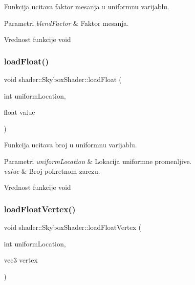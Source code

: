Funkcija ucitava faktor mesanja u uniformnu varijablu. 


\begin{DoxyParams}{Parametri}
{\em blend\+Factor} & Faktor mesanja. \\
\hline
\end{DoxyParams}
\begin{DoxyReturn}{Vrednost funkcije}
void 
\end{DoxyReturn}
\mbox{\label{classshader_1_1SkyboxShader_a76e48c257263e1434e465539824c6670}} 
\subsubsection{\texorpdfstring{load\+Float()}{loadFloat()}}
{\footnotesize\ttfamily void shader\+::\+Skybox\+Shader\+::load\+Float (\begin{DoxyParamCaption}\item[{int}]{uniform\+Location,  }\item[{float}]{value }\end{DoxyParamCaption})}



Funkcija ucitava broj u uniformnu varijablu. 


\begin{DoxyParams}{Parametri}
{\em uniform\+Location} & Lokacija uniformne promenljive. \\
\hline
{\em value} & Broj pokretnom zarezu. \\
\hline
\end{DoxyParams}
\begin{DoxyReturn}{Vrednost funkcije}
void 
\end{DoxyReturn}
\mbox{\label{classshader_1_1SkyboxShader_ad1fe04f2b333178df6d760727ec8193d}} 
\subsubsection{\texorpdfstring{load\+Float\+Vertex()}{loadFloatVertex()}}
{\footnotesize\ttfamily void shader\+::\+Skybox\+Shader\+::load\+Float\+Vertex (\begin{DoxyParamCaption}\item[{int}]{uniform\+Location,  }\item[{vec3}]{vertex }\end{DoxyParamCaption})}



